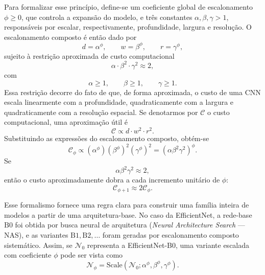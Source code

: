 \documentclass[tcc,capa]{texufpel}
\begin{document}
Para formalizar esse princípio, define-se um coeficiente global de escalonamento \(\phi \ge 0\), que controla a expansão do modelo, e três constantes \(\alpha,\beta,\gamma > 1\), responsáveis por escalar, respectivamente, profundidade, largura e resolução. O escalonamento composto é então dado por
\begin{equation}
	d = \alpha^{\phi}, \qquad
	w = \beta^{\phi}, \qquad
	r = \gamma^{\phi},
\end{equation}
sujeito à restrição aproximada de custo computacional
\begin{equation}
	\alpha \cdot \beta^{2} \cdot \gamma^{2} \approx 2,
\end{equation}
com
\begin{equation}
	\alpha \ge 1,\qquad \beta \ge 1,\qquad \gamma \ge 1.
\end{equation}
Essa restrição decorre do fato de que, de forma aproximada, o custo de uma CNN escala linearmente com a profundidade, quadraticamente com a largura e quadraticamente com a resolução espacial. Se denotarmos por \(\mathcal{C}\) o custo computacional, uma aproximação útil é
\begin{equation}
	\mathcal{C} \propto d \cdot w^2 \cdot r^2.
\end{equation}
Substituindo as expressões do escalonamento composto, obtém-se
\begin{equation}
	\mathcal{C}_{\phi}
	\propto
	(\alpha^{\phi})(\beta^{\phi})^2(\gamma^{\phi})^2
	=
	(\alpha \beta^2 \gamma^2)^{\phi}.
\end{equation}
Se
\begin{equation}
	\alpha \beta^2 \gamma^2 \approx 2,
\end{equation}
então o custo aproximadamente dobra a cada incremento unitário de \(\phi\):
\begin{equation}
	\mathcal{C}_{\phi+1} \approx 2 \mathcal{C}_{\phi}.
\end{equation}

Esse formalismo fornece uma regra clara para construir uma família inteira de modelos a partir de uma arquitetura-base. No caso da EfficientNet, a rede-base \( \text{B0} \) foi obtida por busca neural de arquitetura (\textit{Neural Architecture Search} --- NAS), e as variantes \( \text{B1}, \text{B2}, \dots \) foram geradas por escalonamento composto sistemático. Assim, se \(\mathcal{N}_0\) representa a EfficientNet-B0, uma variante escalada com coeficiente \(\phi\) pode ser vista como
\begin{equation}
	\mathcal{N}_{\phi} = \text{Scale}(\mathcal{N}_0; \alpha^{\phi}, \beta^{\phi}, \gamma^{\phi}).
\end{equation}
\end{document}
